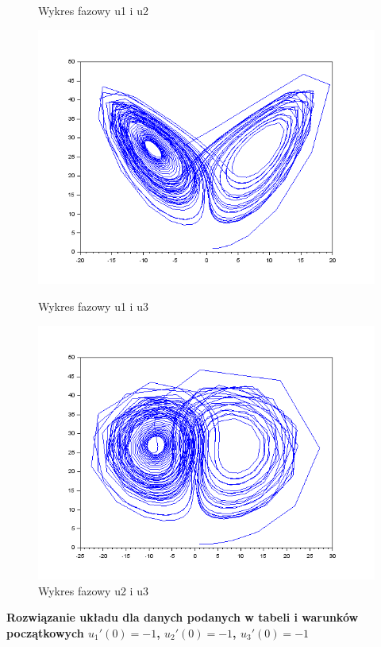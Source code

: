 \documentclass[12pt]{article}
\begin{document}
\begin{figure}[H]
\begin{minipage}[b]{0.49\textwidth}
    \caption{Wykres fazowy u1 i u2}
  \end{minipage}
\begin{minipage}[b]{0.49\textwidth}
    \includegraphics[scale=0.4]{./img/6-111-phase-1-3}
    \caption{Wykres fazowy u1 i u3}
    \end{minipage}
  \hfill
  \begin{minipage}[b]{0.49\textwidth}
    \includegraphics[scale=0.4]{./img/6-111-phase-2-3}
    \caption{Wykres fazowy u2 i u3}
  \end{minipage}
\end{figure}
\newpage
\begin{centering}
\textbf{Rozwiązanie układu dla danych podanych w tabeli i warunków początkowych $u_1'(0)=-1$, $u_2'(0)=-1$, $u_3'(0)=-1$}
\end{centering}
\end{document}
